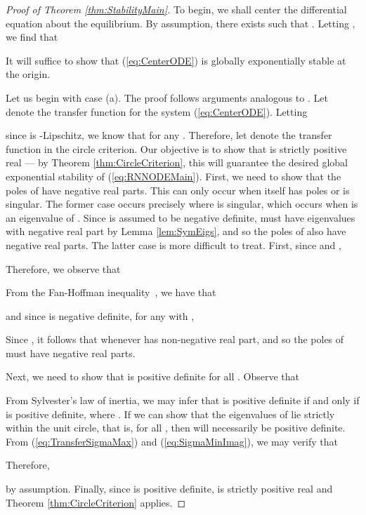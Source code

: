 \documentclass{article} \usepackage{iclr2021_conference,times}
\begin{document}
\begin{proof}[Proof of Theorem \ref{thm:StabilityMain}]
To begin, we shall center the differential equation about the equilibrium. By assumption, there exists  such that . Letting , we find that

It will suffice to show that (\ref{eq:CenterODE}) is globally exponentially stable at the origin.

Let us begin with case (a). The proof follows arguments analogous to \cite[Example 7.1]{khalil2002nonlinear}. Let  denote the transfer function for the system (\ref{eq:CenterODE}). Letting

since  is -Lipschitz, we know that  for any . Therefore, let  denote the transfer function in the circle criterion. Our objective is to show that  is strictly positive real --- by Theorem \ref{thm:CircleCriterion}, this will guarantee the desired global exponential stability of (\ref{eq:RNNODEMain}). First, we need to show that the poles of  have negative real parts. This can only occur when  itself has poles or  is singular. The former case occurs precisely where  is singular, which occurs when  is an eigenvalue of . Since  is assumed to be negative definite,  must have eigenvalues with negative real part by Lemma \ref{lem:SymEigs}, and so the poles of  also have negative real parts. The latter case is more difficult to treat. First, since  and , 

Therefore, we observe that

From the Fan-Hoffman inequality~\citep[Proposition III.5.1]{bhatia2013matrix}, we have that

and since  is negative definite, for any  with ,

Since , it follows that  whenever  has non-negative real part, and so the poles of  must have negative real parts.

Next, we need to show that  is positive definite for all . Observe that

From Sylvester's law of inertia, we may infer that  is positive definite if and only if  is positive definite, where . If we can show that the eigenvalues of  lie strictly within the unit circle, that is,  for all , then  will necessarily be positive definite. From (\ref{eq:TransferSigmaMax}) and (\ref{eq:SigmaMinImag}), we may verify that

Therefore,

by assumption. Finally, since  is positive definite,  is strictly positive real and Theorem \ref{thm:CircleCriterion} applies. 


\end{proof}
\end{document}
